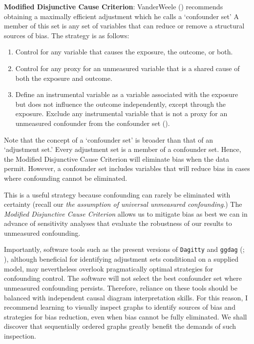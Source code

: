\documentclass[
  singlecolumn]{article}
\providecommand{\tightlist}{%
  \setlength{\itemsep}{0pt}\setlength{\parskip}{0pt}}\usepackage{longtable,booktabs,array}
\begin{document}
\textbf{Modified Disjunctive Cause Criterion}: VanderWeele
() recommends obtaining a maximally
efficient adjustment which he calls a `confounder set' A member of this
set is any set of variables that can reduce or remove a structural
sources of bias. The strategy is as follows:

\begin{enumerate}
\def\labelenumi{\alph{enumi}.}
\tightlist
\item
  Control for any variable that causes the exposure, the outcome, or
  both.
\item
  Control for any proxy for an unmeasured variable that is a shared
  cause of both the exposure and outcome.
\item
  Define an instrumental variable as a variable associated with the
  exposure but does not influence the outcome independently, except
  through the exposure. Exclude any instrumental variable that is not a
  proxy for an unmeasured confounder from the confounder set
  ().
\end{enumerate}

Note that the concept of a `confounder set' is broader than that of an
`adjustment set.' Every adjustment set is a member of a confounder set.
Hence, the Modified Disjunctive Cause Criterion will eliminate bias when
the data permit. However, a confounder set includes variables that will
reduce bias in cases where confounding cannot be eliminated.

This is a useful strategy because confounding can rarely be eliminated
with certainty (recall our \emph{the assumption of universal unmeasured
confounding}.) The \emph{Modified Disjunctive Cause Criterion} allows us
to mitigate bias as best we can in advance of sensitivity analyses that
evaluate the robustness of our results to unmeasured confounding.

Importantly, software tools such as the present versions of
\texttt{Dagitty} and \texttt{ggdag} (; ), although
beneficial for identifying adjustment sets conditional on a supplied
model, may nevertheless overlook pragmatically optimal strategies for
confounding control. The software will not select the best confounder
set where unmeasured confounding persists. Therefore, reliance on these
tools should be balanced with independent causal diagram interpretation
skills. For this reason, I recommend learning to visually inspect graphs
to identify sources of bias and strategies for bias reduction, even when
bias cannot be fully eliminated. We shall discover that sequentially
ordered graphs greatly benefit the demands of such inspection.
\end{document}
